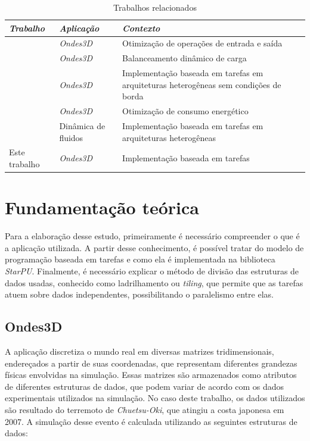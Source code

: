 \documentclass[cic,tc]{iiufrgs}
\begin{document}
\begin{table}[htb!]
    \caption{Trabalhos relacionados}
    \begin{center}
        \begin{tabularx}{\textwidth}{l l X}
            \textit{Trabalho} & \textit{Aplicação} & \textit{Contexto} \\
            \hline
            \hline
            \cite{boito}    & \textit{Ondes3D} & Otimização de operações de entrada e saída \\
            \cite{dupros:hal-00797682}   & \textit{Ondes3D} & Balanceamento dinâmico de carga             \\
            \cite{victor} & \textit{Ondes3D} & Implementação baseada em tarefas em arquiteturas heterogêneas sem condições de borda             \\
            \cite{CASTRO2016108}   & \textit{Ondes3D} & Otimização de consumo energético             \\
            \cite{nesi}     & Dinâmica de fluidos & Implementação baseada em tarefas em arquiteturas heterogêneas \\
            Este trabalho   & \textit{Ondes3D} & Implementação baseada em tarefas             \\
            \hline
        \end{tabularx}
    \end{center}
    \label{tbl:related_works}
\end{table}

\chapter{Fundamentação teórica}\label{sec:theory}
Para a elaboração desse estudo, primeiramente é necessário compreender o que é a aplicação utilizada. A partir desse conhecimento, é possível tratar do modelo de programação
baseada em tarefas e como ela é implementada na biblioteca \textit{StarPU}. Finalmente, é necessário explicar o método de divisão das estruturas de dados usadas, conhecido como
ladrilhamento ou \textit{tiling}, que permite que as tarefas atuem sobre dados independentes, possibilitando o paralelismo entre elas.

\section{Ondes3D}
A aplicação discretiza o mundo real em diversas matrizes tridimensionais, endereçados a partir de suas coordenadas, que representam diferentes grandezas físicas envolvidas
na simulação. Essas matrizes são armazenados como atributos de diferentes estruturas de dados, que podem variar de acordo com os dados experimentais utilizados na simulação. No caso
deste trabalho, os dados utilizados são resultado do terremoto de \textit{Chuetsu-Oki}, que atingiu a costa japonesa em 2007. A simulação desse evento é calculada utilizando as
seguintes estruturas de dados:
\end{document}
